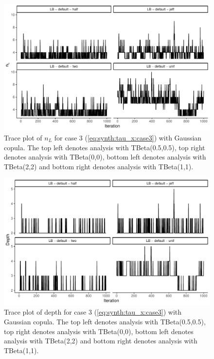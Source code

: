 \documentclass{amsart}
\begin{document}
\begin{figure}
	\centering
	\includegraphics[width = 0.75\linewidth]{trace_case3_gauss_nterm.pdf}
	\caption{Trace plot of $n_L$ for case 3 (\cref{eq:synth:tau_x:case3}) with Gaussian copula. The top left denotes analysis with TBeta(0.5,0.5), top right denotes analysis with TBeta(0,0), bottom left denotes analysis with TBeta(2,2) and bottom right denotes analysis with TBeta(1,1).}
	\label{fig:case3:gauss:nterm}
\end{figure}

\begin{figure}
	\centering
	\includegraphics[width = 0.75\linewidth]{trace_case3_gauss_depth.pdf}
	\caption{Trace plot of depth for case 3 (\cref{eq:synth:tau_x:case3}) with Gaussian copula. The top left denotes analysis with TBeta(0.5,0.5), top right denotes analysis with TBeta(0,0), bottom left denotes analysis with TBeta(2,2) and bottom right denotes analysis with TBeta(1,1).}
	\label{fig:case3:gauss:depth}
\end{figure}
\end{document}
